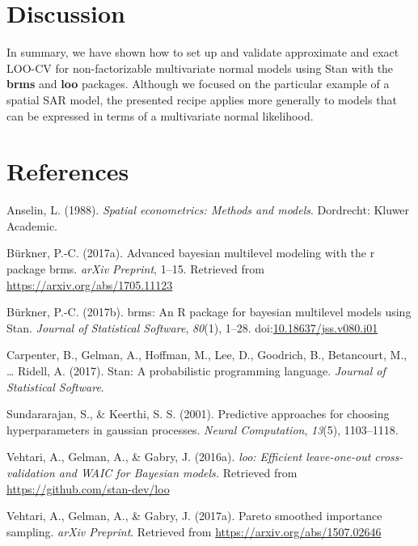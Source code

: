 \documentclass[english,,doc,floatsintext]{apa6}
\theoremstyle{definition}
\theoremstyle{definition}
\theoremstyle{definition}
\theoremstyle{remark}
\begin{document}
\hypertarget{discussion}{%
\section{Discussion}\label{discussion}}

In summary, we have shown how to set up and validate approximate and
exact LOO-CV for non-factorizable multivariate normal models using Stan
with the \textbf{brms} and \textbf{loo} packages. Although we focused on
the particular example of a spatial SAR model, the presented recipe
applies more generally to models that can be expressed in terms of a
multivariate normal likelihood.

\hypertarget{references}{%
\section*{References}\label{references}}

\hypertarget{refs}{}
\leavevmode\hypertarget{ref-anselin1988}{}%
Anselin, L. (1988). \emph{Spatial econometrics: Methods and models}.
Dordrecht: Kluwer Academic.

\leavevmode\hypertarget{ref-brms2}{}%
Bürkner, P.-C. (2017a). Advanced bayesian multilevel modeling with the r
package brms. \emph{arXiv Preprint}, 1--15. Retrieved from
\url{https://arxiv.org/abs/1705.11123}

\leavevmode\hypertarget{ref-brms1}{}%
Bürkner, P.-C. (2017b). brms: An R package for bayesian multilevel
models using Stan. \emph{Journal of Statistical Software}, \emph{80}(1),
1--28.
doi:\href{https://doi.org/10.18637/jss.v080.i01}{10.18637/jss.v080.i01}

\leavevmode\hypertarget{ref-carpenter2017}{}%
Carpenter, B., Gelman, A., Hoffman, M., Lee, D., Goodrich, B.,
Betancourt, M., \ldots{} Ridell, A. (2017). Stan: A probabilistic
programming language. \emph{Journal of Statistical Software}.

\leavevmode\hypertarget{ref-sundararajan2001}{}%
Sundararajan, S., \& Keerthi, S. S. (2001). Predictive approaches for
choosing hyperparameters in gaussian processes. \emph{Neural
Computation}, \emph{13}(5), 1103--1118.

\leavevmode\hypertarget{ref-loo2016}{}%
Vehtari, A., Gelman, A., \& Gabry, J. (2016a). \emph{loo: Efficient
leave-one-out cross-validation and WAIC for Bayesian models.} Retrieved
from \url{https://github.com/stan-dev/loo}

\leavevmode\hypertarget{ref-vehtari2017b}{}%
Vehtari, A., Gelman, A., \& Gabry, J. (2017a). Pareto smoothed
importance sampling. \emph{arXiv Preprint}. Retrieved from
\url{https://arxiv.org/abs/1507.02646}
\end{document}
